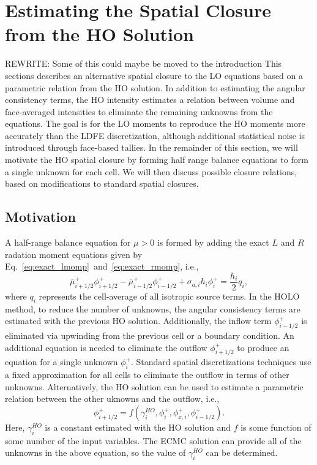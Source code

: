 
\section{Estimating the Spatial Closure from the HO Solution}
\label{sec:spat_clos}

REWRITE: Some of this could maybe be moved to the introduction
This sections describes an alternative spatial closure to the LO equations based on 
a parametric relation from the HO solution. In addition to estimating the angular
consistency terms, the HO intensity estimates a relation between volume and face-averaged
intensities to eliminate the remaining unknowns from the equations.  The goal is for the 
LO moments to reproduce the HO moments more accurately than the LDFE discretization, although
additional statistical noise is introduced through face-based tallies.  In the remainder of this section, we will motivate the HO spatial closure by forming half
range balance equations to form a single unknown for each cell.  We will then discuss
possible closure relations, based on modifications to standard spatial closures.

\subsection{Motivation}

A half-range balance equation for $\mu>0$ is formed by adding the
exact $L$ and
$R$ radation moment equations given by
Eq.~\eqref{eq:exact_lmomp}~and~\eqref{eq:exact_rmomp}, i.e.,
\begin{equation}\label{eq:hr_bal}
    \overline\mu^+_{i+1/2}\phi_{i+1/2}^+ - \overline\mu^+_{i-1/2}\phi_{i-1/2}^+ +
    {\sigma_{a,i}h_i} \phi_i^+ = \frac{h_i}{2} q_i,
\end{equation}
where $q_i$ represents the cell-average of all isotropic source terms.  In the HOLO
method, to reduce the number of unknowns, the
angular consistency terms are estimated
with the previous HO solution.  Additionally, the inflow term $\phi_{i-1/2}^+$ is eliminated via upwinding from the previous
cell or a boundary condition.  An additional equation is needed to eliminate the outflow $\phi_{i+1/2}^+$ to produce an
equation for a single unknown $\phi_{i}^+$.  Standard spatial discretizations techniques
use a fixed approximation for all cells to eliminate the outflow in terms of other
unknowns.  Alternatively, the HO solution can be used to estimate a parametric relation
between the other uknowns and the outflow, i.e.,
\begin{equation}
    \phi_{i+1/2}^+ = f(\gamma^{HO}_i, \phi_i^+, \phi_{x,i}^+, \phi_{i-1/2}^+).
\end{equation}
Here, $\gamma^{HO}_i$ is a constant estimated with the HO solution and $f$ is some
function of some number of the input
variables.  The ECMC solution can provide all of the unknowns in the above equation, so
the value of $\gamma^{HO}_i$ can be determined.


